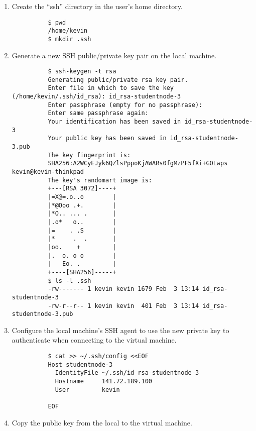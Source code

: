 \begin{enumerate}
  \item Create the \enquote{ssh} directory in the user's home directory.

        \begin{verbatim}
          $ pwd
          /home/kevin
          $ mkdir .ssh
        \end{verbatim}

  \item Generate a new SSH public/private key pair on the local machine.

        \begin{verbatim}
          $ ssh-keygen -t rsa
          Generating public/private rsa key pair.
          Enter file in which to save the key (/home/kevin/.ssh/id_rsa): id_rsa-studentnode-3
          Enter passphrase (empty for no passphrase):
          Enter same passphrase again:
          Your identification has been saved in id_rsa-studentnode-3
          Your public key has been saved in id_rsa-studentnode-3.pub
          The key fingerprint is:
          SHA256:A2WCyEJyk6QZlsPppoKjAWARs0fgMzPF5fXi+GOLwps kevin@kevin-thinkpad
          The key's randomart image is:
          +---[RSA 3072]----+
          |=X@=.o..o        |
          |*@Ooo .+.        |
          |*O.. ... .       |
          |.o*   o..        |
          |=    . .S        |
          |*     .  .       |
          |oo.    +         |
          |.  o. o o        |
          |   Eo. .         |
          +----[SHA256]-----+
          $ ls -l .ssh
          -rw------- 1 kevin kevin 1679 Feb  3 13:14 id_rsa-studentnode-3
          -rw-r--r-- 1 kevin kevin  401 Feb  3 13:14 id_rsa-studentnode-3.pub
        \end{verbatim}

  \item Configure the local machine's SSH agent to use the new private key to authenticate when connecting to the virtual machine.

        \begin{verbatim}
          $ cat >> ~/.ssh/config <<EOF
          Host studentnode-3
            IdentityFile ~/.ssh/id_rsa-studentnode-3
            Hostname     141.72.189.100
            User         kevin
       
          EOF
        \end{verbatim}

  \item Copy the public key from the local to the virtual machine.


\end{enumerate}
